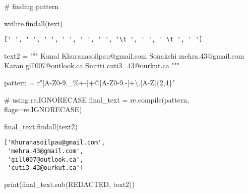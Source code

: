 \documentclass[
  letterpaper,
  DIV=11,
  numbers=noendperiod]{scrreprt}
\newenvironment{Shaded}{\begin{snugshade}}{\end{snugshade}}
\newcommand{\BuiltInTok}[1]{\textcolor[rgb]{0.00,0.23,0.31}{#1}}
\newcommand{\CommentTok}[1]{\textcolor[rgb]{0.37,0.37,0.37}{#1}}
\newcommand{\NormalTok}[1]{\textcolor[rgb]{0.00,0.23,0.31}{#1}}
\newcommand{\OperatorTok}[1]{\textcolor[rgb]{0.37,0.37,0.37}{#1}}
\newcommand{\StringTok}[1]{\textcolor[rgb]{0.13,0.47,0.30}{#1}}
\newcommand{\VerbatimStringTok}[1]{\textcolor[rgb]{0.13,0.47,0.30}{#1}}
\begin{document}
\begin{Shaded}
\begin{Highlighting}[]
\CommentTok{\# finding pattern}

\NormalTok{withre.findall(text)}
\end{Highlighting}
\end{Shaded}

\begin{verbatim}
[' ', ' ', ' ', ' ', ' ', ' ', '\t ', ' ', ' \t ', ' ']
\end{verbatim}

\begin{Shaded}
\begin{Highlighting}[]
\NormalTok{text2 }\OperatorTok{=} \StringTok{"""}
\StringTok{Kunal Khuranasoilpau@gmail.com}
\StringTok{Sonakshi mehra.43@gmail.com}
\StringTok{Karan gill007@outlook.ca}
\StringTok{Smriti cuti3\_43@ourkut.ca}
\StringTok{"""}
\end{Highlighting}
\end{Shaded}

\begin{Shaded}
\begin{Highlighting}[]
\NormalTok{pattern }\OperatorTok{=} \VerbatimStringTok{r"[A{-}Z0{-}9.\_\%+{-}]+@[A{-}Z0{-}9.{-}]+\textbackslash{}.[A{-}Z]\{2,4\}"}
\end{Highlighting}
\end{Shaded}

\begin{Shaded}
\begin{Highlighting}[]
\CommentTok{\# using re.IGNORECASE}
\NormalTok{final\_text }\OperatorTok{=}\NormalTok{ re.}\BuiltInTok{compile}\NormalTok{(pattern, flags}\OperatorTok{=}\NormalTok{re.IGNORECASE)}

\NormalTok{final\_text.findall(text2)}
\end{Highlighting}
\end{Shaded}

\begin{verbatim}
['Khuranasoilpau@gmail.com',
 'mehra.43@gmail.com',
 'gill007@outlook.ca',
 'cuti3_43@ourkut.ca']
\end{verbatim}

\begin{Shaded}
\begin{Highlighting}[]
\BuiltInTok{print}\NormalTok{(final\_text.sub(}\StringTok{\textquotesingle{}REDACTED\textquotesingle{}}\NormalTok{, text2))}
\end{Highlighting}
\end{Shaded}
\end{document}
